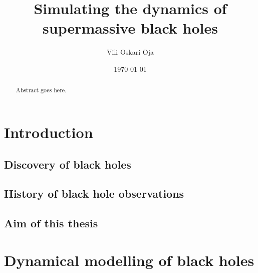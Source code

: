 \documentclass[english, oneside]{HYgradu}
\title{Simulating the dynamics of supermassive black holes}
\author{Vili Oskari Oja}
\date{\today}
\begin{document}
\setlength{\parindent}{1cm}
\setlength{\parskip}{0cm}
\maketitle

\begin{abstract}
Abstract goes here.
\end{abstract}

\mytableofcontents


\setlength{\parindent}{.75cm}
\setlength{\parskip}{.6cm}
\chapter{Introduction}


\section{Discovery of black holes}

\section{History of black hole observations}

\section{Aim of this thesis}

\chapter{Dynamical modelling of black holes}
\end{document}
